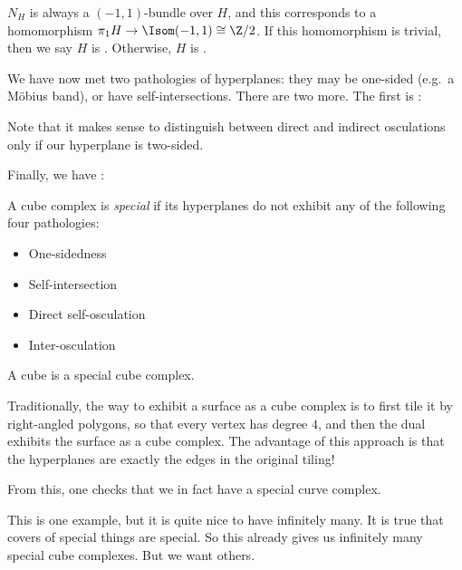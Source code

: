 \documentclass[a4paper]{article}
\begin{document}


$N_H$ is always a $(-1, 1)$-bundle over $H$, and this corresponds to a homomorphism $\pi_1 H \to \Isom(-1, 1) \cong \Z/2$. If this homomorphism is trivial, then we say $H$ is . Otherwise, $H$ is .

We have now met two pathologies of hyperplanes: they may be one-sided (e.g.\ a M\"obius band), or have self-intersections. There are two more. The first is :


Note that it makes sense to distinguish between direct and indirect osculations only if our hyperplane is two-sided.

Finally, we have :


\begin{defi}
  A cube complex is \emph{special} if its hyperplanes do not exhibit any of the following four pathologies:
  \begin{itemize}
    \item One-sidedness
    \item Self-intersection
    \item Direct self-osculation
    \item Inter-osculation
  \end{itemize}
\end{defi}

\begin{eg}
  A cube is a special cube complex.
\end{eg}

\begin{eg}
  Traditionally, the way to exhibit a surface as a cube complex is to first tile it by right-angled polygons, so that every vertex has degree $4$, and then the dual exhibits the surface as a cube complex. The advantage of this approach is that the hyperplanes are exactly the edges in the original tiling!


  From this, one checks that we in fact have a special curve complex.
\end{eg}
This is one example, but it is quite nice to have infinitely many. It is true that covers of special things are special. So this already gives us infinitely many special cube complexes. But we want others.
\end{document}
